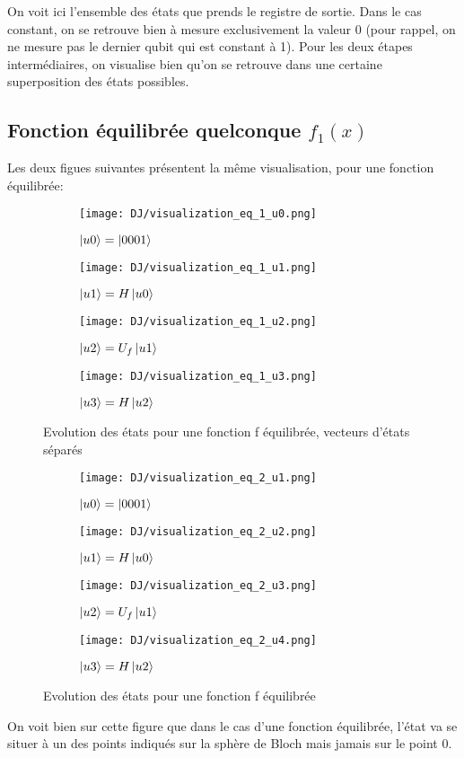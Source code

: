 On voit ici l'ensemble des états que prends le registre de sortie. Dans le cas constant, on se retrouve bien à mesure exclusivement la valeur 0 (pour rappel, on ne mesure pas le dernier qubit qui est constant à 1). Pour les deux étapes intermédiaires, on visualise bien qu'on se retrouve dans une certaine superposition des états possibles.

\pagebreak

\subsection{Fonction équilibrée quelconque $f_1(x)$}
Les deux figues suivantes présentent la même visualisation, pour une fonction équilibrée:

\begin{figure}[ht]
  \begin{subfigure}[b]{0.6\textwidth}
      \centering
      \texttt{[image: DJ/visualization\_eq\_1\_u0.png]}
      \caption{$\ket{u0}=\ket{0001}$}
  \end{subfigure}
  \begin{subfigure}[b]{0.6\textwidth}
      \centering
      \texttt{[image: DJ/visualization\_eq\_1\_u1.png]}
      \caption{$\ket{u1}=H\ket{u0}$}
  \end{subfigure}
  \begin{subfigure}[b]{0.6\textwidth}
      \centering
      \texttt{[image: DJ/visualization\_eq\_1\_u2.png]}
      \caption{$\ket{u2}=U_f\ket{u1}$}
  \end{subfigure}
  \begin{subfigure}[b]{0.6\textwidth}
    \centering
    \texttt{[image: DJ/visualization\_eq\_1\_u3.png]}
    \caption{$\ket{u3}=H\ket{u2}$}
\end{subfigure}
     \caption{Evolution des états pour une fonction f équilibrée, vecteurs d'états séparés}
\end{figure}

\begin{figure}[bth]
  \begin{subfigure}[b]{0.23\textwidth}
      \centering
      \texttt{[image: DJ/visualization\_eq\_2\_u1.png]}
      \caption{$\ket{u0}=\ket{0001}$}
  \end{subfigure}
  \begin{subfigure}[b]{0.23\textwidth}
      \centering
      \texttt{[image: DJ/visualization\_eq\_2\_u2.png]}
      \caption{$\ket{u1}=H\ket{u0}$}
  \end{subfigure}
  \begin{subfigure}[b]{0.23\textwidth}
      \centering
      \texttt{[image: DJ/visualization\_eq\_2\_u3.png]}
      \caption{$\ket{u2}=U_f\ket{u1}$}
  \end{subfigure}
  \begin{subfigure}[b]{0.23\textwidth}
    \centering
    \texttt{[image: DJ/visualization\_eq\_2\_u4.png]}
    \caption{$\ket{u3}=H\ket{u2}$}
\end{subfigure}
     \caption{Evolution des états pour une fonction f équilibrée}
\end{figure}

On voit bien sur cette figure que dans le cas d'une fonction équilibrée, l'état va se situer à un des points indiqués sur la sphère de Bloch mais jamais sur le point 0. 
